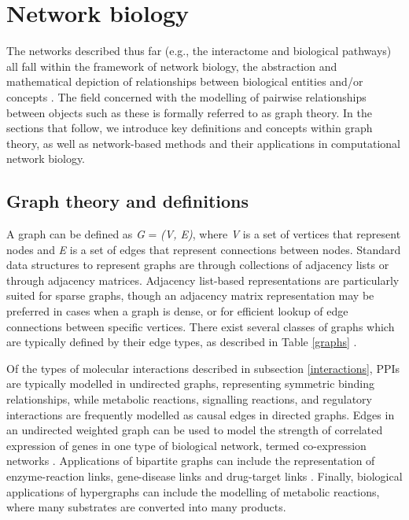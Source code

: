 \section{Network biology}

The networks described thus far (e.g., the interactome and biological pathways) all fall within the framework of network biology, the abstraction and mathematical depiction of relationships between biological entities and/or concepts \parencite{liu2020}. The field concerned with the modelling of pairwise relationships between objects such as these is formally referred to as graph theory. In the sections that follow, we introduce key definitions and concepts within graph theory, as well as network-based methods and their applications in computational network biology. 

\subsection{Graph theory and definitions}

A graph can be defined as \textit{G} = \textit{(V, E)}, where \textit{V} is a set of vertices that represent nodes and \textit{E} is a set of edges that represent connections between nodes. Standard data structures to represent graphs are through collections of adjacency lists or through adjacency matrices. Adjacency list-based representations are particularly suited for sparse graphs, though an adjacency matrix representation may be preferred in cases when a graph is dense, or for efficient lookup of edge connections between specific vertices. There exist several classes of graphs which are typically defined by their edge types, as described in Table \ref{graphs}  \parencite{pavlopoulos2011,mason2007,cormen2022}.

Of the types of molecular interactions described in subsection \ref{interactions}, PPIs are typically modelled in undirected graphs, representing symmetric binding relationships, while metabolic reactions, signalling reactions, and regulatory interactions are frequently modelled as causal edges in directed graphs. Edges in an undirected weighted graph can be used to model the strength of correlated expression of genes in one type of biological network, termed co-expression networks \parencite{langfelder2008}. Applications of bipartite graphs can include the representation of enzyme-reaction links, gene-disease links and drug-target links \parencite{pavlopoulos2018}. Finally, biological applications of hypergraphs can include the modelling of metabolic reactions, where many substrates are converted into many products.

